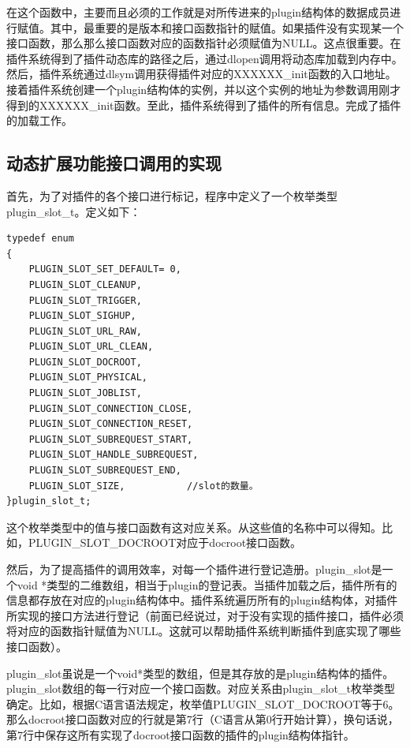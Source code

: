\documentclass[12pt, twoside, a4paper, xetex]{report}
\begin{document}
	在这个函数中，主要而且必须的工作就是对所传进来的plugin结构体的数据成员进行赋值。其中，最重要的是版本和接口函数指针的赋值。如果插件没有实现某一个接口函数，那么那么接口函数对应的函数指针必须赋值为NULL。这点很重要。在插件系统得到了插件动态库的路径之后，通过dlopen调用将动态库加载到内存中。然后，插件系统通过dlsym调用获得插件对应的XXXXXX\_init函数的入口地址。接着插件系统创建一个plugin结构体的实例，并以这个实例的地址为参数调用刚才得到的XXXXXX\_init函数。至此，插件系统得到了插件的所有信息。完成了插件的加载工作。
	
\subsection{动态扩展功能接口调用的实现}

	首先，为了对插件的各个接口进行标记，程序中定义了一个枚举类型plugin\_slot\_t。定义如下：
\begin{verbatim}
typedef enum
{
	PLUGIN_SLOT_SET_DEFAULT= 0,
	PLUGIN_SLOT_CLEANUP,
	PLUGIN_SLOT_TRIGGER,
	PLUGIN_SLOT_SIGHUP,
	PLUGIN_SLOT_URL_RAW,
	PLUGIN_SLOT_URL_CLEAN,
	PLUGIN_SLOT_DOCROOT,
	PLUGIN_SLOT_PHYSICAL,
	PLUGIN_SLOT_JOBLIST,
	PLUGIN_SLOT_CONNECTION_CLOSE,
	PLUGIN_SLOT_CONNECTION_RESET,
	PLUGIN_SLOT_SUBREQUEST_START,
	PLUGIN_SLOT_HANDLE_SUBREQUEST,
	PLUGIN_SLOT_SUBREQUEST_END,
	PLUGIN_SLOT_SIZE, 			//slot的数量。
}plugin_slot_t;
\end{verbatim}

	这个枚举类型中的值与接口函数有这对应关系。从这些值的名称中可以得知。比如，PLUGIN\_SLOT\_DOCROOT对应于docroot接口函数。
	
	然后，为了提高插件的调用效率，对每一个插件进行登记造册。plugin\_slot是一个void *类型的二维数组，相当于plugin的登记表。当插件加载之后，插件所有的信息都存放在对应的plugin结构体中。插件系统遍历所有的plugin结构体，对插件所实现的接口方法进行登记（前面已经说过，对于没有实现的插件接口，插件必须将对应的函数指针赋值为NULL。这就可以帮助插件系统判断插件到底实现了哪些接口函数）。
	
	plugin\_slot虽说是一个void*类型的数组，但是其存放的是plugin结构体的插件。plugin\_slot数组的每一行对应一个接口函数。对应关系由plugin\_slot\_t枚举类型确定。比如，根据C语言语法规定，枚举值PLUGIN\_SLOT\_DOCROOT等于6。那么docroot接口函数对应的行就是第7行（C语言从第0行开始计算），换句话说，第7行中保存这所有实现了docroot接口函数的插件的plugin结构体指针。
	
\end{document}

